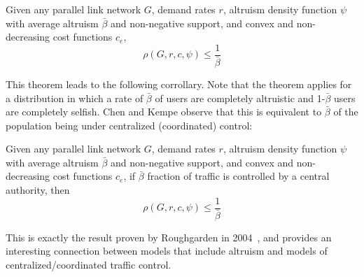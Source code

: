 \begin{theorem}
Given any parallel link network $G$, demand rates $r$, altruism density function $\psi$ with average altruism $\bar{\beta}$ and non-negative support, and convex and non-decreasing cost functions $c_e$,
   $$\rho(G,r,c,\psi) \le \frac{1}{\bar{\beta}}$$
\end{theorem}

\begin{proof-sketch}
\end{proof-sketch}

This theorem leads to the following corrollary. Note that the theorem applies for a distribution in which a rate of $\bar{\beta}$ of users are completely altruistic and 1-$\bar{\beta}$ users are completely selfish. Chen and Kempe observe that this is equivalent to $\bar{\beta}$ of the population being under centralized (coordinated) control:
\begin{corollary}
Given any parallel link network $G$, demand rates $r$, altruism density function $\psi$ with average altruism $\bar{\beta}$ and non-negative support, and convex and non-decreasing cost functions $c_e$,
if $\bar{\beta}$ fraction of traffic is controlled by a central authority, then
   $$\rho(G,r,c,\psi) \le \frac{1}{\bar{\beta}}$$
\end{corollary}
This is exactly the result proven by Roughgarden in 2004~\cite{roughgarden04}, and provides an interesting connection between models that include altruism and models of centralized/coordinated traffic control.

